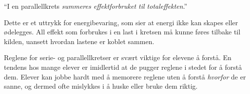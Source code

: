 \vskip 30pt

\noindent
``I en parallellkrets {\it summeres effektforbruket til totaleffekten}.''

\vskip 10pt

Dette er et uttrykk for energibevaring, som sier at energi ikke kan skapes eller ødelegges.  All effekt som forbrukes i en last i kretsen må kunne føres tilbake til kilden, uansett hvordan lastene er koblet sammen.







Reglene for serie- og parallellkretser er svært viktige for elevene å forstå.  En tendens hos mange elever er imidlertid at de pugger reglene i stedet for å forstå dem.  Elever kan jobbe hardt med å memorere reglene uten å forstå {\it hvorfor} de er sanne, og dermed ofte mislykkes i å huske eller bruke dem riktig.



